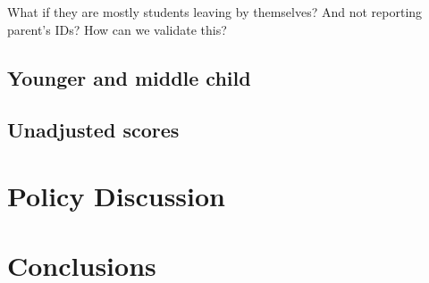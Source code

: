What if they are mostly students leaving by themselves? And not reporting parent's IDs? How can we validate this?

\subsection{Younger and middle child}

\subsection{Unadjusted scores}

\section{Policy Discussion}\label{sec:policy}

\section{Conclusions}\label{sec:conclusions}






